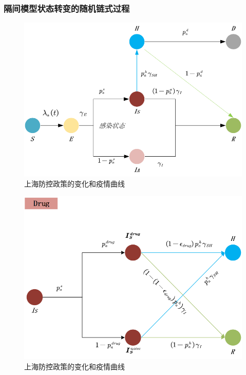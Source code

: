 \documentclass[bwprint]{gmcmthesis}
\numberwithin{figure}{section}
\begin{document}
\subsubsection{隔间模型状态转变的随机链式过程}
\begin{figure}[!h]
\centering
\includegraphics[width=.75\textwidth]{seirhd.png}
\caption{上海防控政策的变化和疫情曲线}
\label{fig3}
\end{figure}

\begin{figure}[!h]
\centering
\includegraphics[width=.75\textwidth]{Drug.png}
\caption{上海防控政策的变化和疫情曲线}
\label{fig3}
\end{figure}
\end{document}

